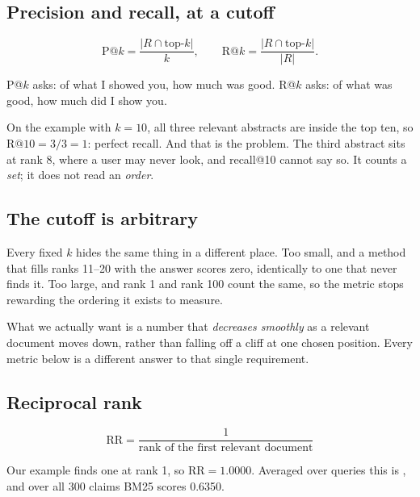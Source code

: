 \documentclass[11pt,a4paper]{article}
\begin{document}

\subsection{Precision and recall, at a cutoff}

\[
  \text{P}@k = \frac{|R \cap \text{top-}k|}{k},
  \qquad
  \text{R}@k = \frac{|R \cap \text{top-}k|}{|R|}.
\]

P@$k$ asks: of what I showed you, how much was good. R@$k$ asks: of what was
good, how much did I show you.

On the example with $k=10$, all three relevant abstracts are inside the top
ten, so $\text{R}@10 = 3/3 = 1$: perfect recall. And that is the problem. The
third abstract sits at rank 8, where a user may never look, and recall@10
cannot say so. It counts a \emph{set}; it does not read an \emph{order}.

\subsection{The cutoff is arbitrary}

Every fixed $k$ hides the same thing in a different place. Too small, and a
method that fills ranks 11--20 with the answer scores zero, identically to one
that never finds it. Too large, and rank 1 and rank 100 count the same, so the
metric stops rewarding the ordering it exists to measure.

What we actually want is a number that \emph{decreases smoothly} as a relevant
document moves down, rather than falling off a cliff at one chosen position.
Every metric below is a different answer to that single requirement.

\subsection{Reciprocal rank}

\[ \text{RR} = \frac{1}{\text{rank of the first relevant document}} \]

Our example finds one at rank 1, so $\text{RR} = 1.0000$. Averaged over queries
this is , and over all 300 claims BM25 scores 0.6350.
\end{document}
